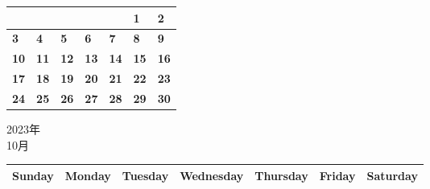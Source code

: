 \documentclass[a4paper,landscape]{jsarticle}
\newcommand{\dig}{\hspace{29mm}}
\newcommand{\tdig}{\hspace{27mm}}
\newcommand{\LBF}{\LARGE\textbf}
\begin{document}
\begingroup
\renewcommand{\arraystretch}{4}
\begin{tabular}{|p{32mm}|p{32mm}|p{32mm}|p{32mm}|p{32mm}|p{32mm}|p{32mm}|}
\hline
&&&&&\raisebox{30pt} {\dig\LBF{1}}&\raisebox{30pt} {\dig\LBF{2}}\\
\hline
\raisebox{30pt} {\dig\LBF{3}}&\raisebox{30pt} {\dig\LBF{4}}&\raisebox{30pt} {\dig\LBF{5}}&\raisebox{30pt} {\dig\LBF{6}}&\raisebox{30pt} {\dig\LBF{7}}&\raisebox{30pt} {\dig\LBF{8}}&\raisebox{30pt} {\dig\LBF{9}}\\
\hline
\raisebox{30pt} {\tdig\LBF{10}}&\raisebox{30pt} {\tdig\LBF{11}}&\raisebox{30pt} {\tdig\LBF{12}}&\raisebox{30pt} {\tdig\LBF{13}}&\raisebox{30pt} {\tdig\LBF{14}}&\raisebox{30pt} {\tdig\LBF{15}}&\raisebox{30pt} {\tdig\LBF{16}}\\
\hline
\raisebox{30pt} {\tdig\LBF{17}}&\raisebox{30pt} {\tdig\LBF{18}}&\raisebox{30pt} {\tdig\LBF{19}}&\raisebox{30pt} {\tdig\LBF{20}}&\raisebox{30pt} {\tdig\LBF{21}}&\raisebox{30pt} {\tdig\LBF{22}}&\raisebox{30pt} {\tdig\LBF{23}}\\
\hline
\raisebox{30pt} {\tdig\LBF{24}}&\raisebox{30pt} {\tdig\LBF{25}}&\raisebox{30pt} {\tdig\LBF{26}}&\raisebox{30pt} {\tdig\LBF{27}}&\raisebox{30pt} {\tdig\LBF{28}}&\raisebox{30pt} {\tdig\LBF{29}}&\raisebox{30pt} {\tdig\LBF{30}}\\
\hline
\end{tabular}
\endgroup
\newpage\begin{center}
	\LARGE 2023年\\
	\LARGE 10月
\end{center}

\begingroup
\renewcommand{\arraystretch}{1.4}
\begin{tabular}{|>{\centering\arraybackslash}p{32mm}|>{\centering\arraybackslash}p{32mm}|>{\centering\arraybackslash}p{32mm}|>{\centering\arraybackslash}p{32mm}|>{\centering\arraybackslash}p{32mm}|>{\centering\arraybackslash}p{32mm}|>{\centering\arraybackslash}p{32mm}|}
\hline
\large Sunday&\large Monday &\large Tuesday&\large Wednesday&\large Thursday&\large Friday&\large Saturday\\
\hline
\end{tabular}
\endgroup
\end{document}
